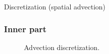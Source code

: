\documentclass{beamer}
\begin{document}
	\begin{frame}{Discretization (spatial advection)}
	\subsubsection{Inner part}\label{subsubsec:advection-inner}
	\begin{figure}[H] %
	  \caption{Advection discretization.}\label{fig:ADV}
	\end{figure}	
	\end{frame}
	
	
\end{document}
